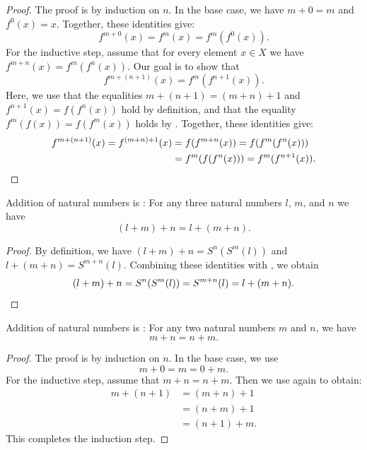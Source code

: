 \begin{proof}
  The proof is by induction on $n$. In the base case, we have $m+0=m$ and $f^0(x)=x$. Together, these identities give:
  \begin{equation*}
    f^{m+0}(x)=f^m(x)=f^m(f^0(x)).
  \end{equation*}
  For the inductive step, assume that for every element $x\in X$ we have $f^{m+n}(x)=f^m(f^n(x))$. Our goal is to show that
  \begin{equation*}
    f^{m+(n+1)}(x)=f^m(f^{n+1}(x)).
  \end{equation*}
  Here, we use that the equalities $m+(n+1)=(m+n)+1$ and $f^{n+1}(x)=f(f^n(x))$ hold by definition, and that the equality $f^m(f(x))=f(f^m(x))$ holds by . Together, these identities give:
  \begin{align*}
    f^{m+(n+1)}(x)=f^{(m+n)+1}(x) & =f(f^{m+n}(x))=f(f^m(f^n(x))) \\
                                  & =f^m(f(f^n(x)))=f^m(f^{n+1}(x)).\qedhere
  \end{align*}
\end{proof}

\begin{corollary}
  Addition of natural numbers is : For any three natural numbers $l$, $m$, and $n$ we have
  \begin{equation*}
    (l+m)+n = l+(m+n).
  \end{equation*}
\end{corollary}

\begin{proof}
  By definition, we have $(l+m)+n=S^n(S^m(l))$ and $l+(m+n)=S^{m+n}(l)$. Combining these identities with , we obtain
  \begin{equation*}
    (l+m)+n=S^n(S^m(l))=S^{m+n}(l)=l+(m+n).\qedhere
  \end{equation*}
\end{proof}

\begin{proposition}
  Addition of natural numbers is : For any two natural numbers $m$ and $n$, we have
  \begin{equation*}
    m+n=n+m.
  \end{equation*}
\end{proposition}

\begin{proof}
  The proof is by induction on $n$. In the base case, we use 
  \begin{equation*}
    m+0=m=0+m.
  \end{equation*}
  For the inductive step, assume that $m+n=n+m$. Then we use  again to obtain:
  \begin{align*}
    m+(n+1) & = (m+n)+1 \\
            & = (n+m)+1 \\
            & = (n+1)+m.
  \end{align*}
  This completes the induction step.
\end{proof}

